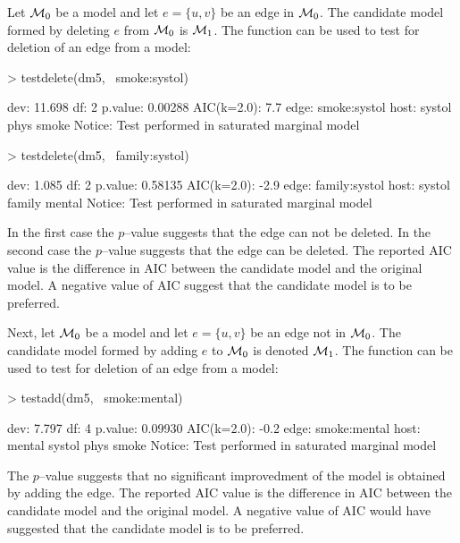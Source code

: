 \documentclass[12pt]{article}
\begin{document}
Let ${\cal M}_0$ be a model and let $e=\{u,v\}$ be an edge in ${\cal M}_0$.
The candidate model  formed by deleting $e$ from ${\cal M}_0$ is ${\cal M}_1$.
The  function can be used to test for deletion of
an edge from a model:

\begin{Schunk}
\begin{Sinput}
> testdelete(dm5, ~smoke:systol)
\end{Sinput}
\begin{Soutput}
dev:   11.698 df:  2 p.value: 0.00288 AIC(k=2.0):    7.7 edge: smoke:systol 
host:  systol phys smoke 
Notice: Test performed in saturated marginal model
\end{Soutput}
\begin{Sinput}
> testdelete(dm5, ~family:systol)
\end{Sinput}
\begin{Soutput}
dev:    1.085 df:  2 p.value: 0.58135 AIC(k=2.0):   -2.9 edge: family:systol 
host:  systol family mental 
Notice: Test performed in saturated marginal model
\end{Soutput}
\end{Schunk}


In the first case the $p$--value suggests that the edge can not be
deleted. In the second case the $p$--value suggests that the edge can
be deleted. The reported AIC
value is the difference in AIC between the candidate model and the
original model. A negative value of AIC suggest that the candidate
model is to be preferred.


Next, let ${\cal M}_0$ be a model and let $e=\{u,v\}$ be an edge not in
${\cal M}_0$. The candidate model  formed by adding $e$ to ${\cal M}_0$ is
denoted ${\cal M}_1$.
The  function can be used to test for deletion of
an edge from a model:

\begin{Schunk}
\begin{Sinput}
> testadd(dm5, ~smoke:mental)
\end{Sinput}
\begin{Soutput}
dev:    7.797 df:  4 p.value: 0.09930 AIC(k=2.0):   -0.2 edge: smoke:mental 
host:  mental systol phys smoke 
Notice: Test performed in saturated marginal model
\end{Soutput}
\end{Schunk}

The $p$--value suggests that no significant improvedment of the model
is obtained by adding the edge. The reported AIC value is the
difference in AIC between the candidate model and the original
model. A negative value of AIC would have suggested that the candidate
model is to be preferred.
\end{document}

